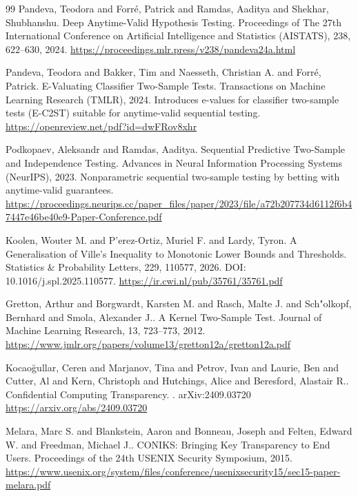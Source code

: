 \documentclass[11pt]{article}
\begin{document}
\begin{thebibliography}{99}
Pandeva, Teodora and Forr{\'e}, Patrick and Ramdas, Aaditya and Shekhar, Shubhanshu.
\newblock Deep Anytime-Valid Hypothesis Testing.
\newblock Proceedings of The 27th International Conference on Artificial Intelligence and Statistics (AISTATS), 238, 622--630, 2024.
\newblock \url{https://proceedings.mlr.press/v238/pandeva24a.html}

Pandeva, Teodora and Bakker, Tim and Naesseth, Christian A. and Forr{\'e}, Patrick.
\newblock E-Valuating Classifier Two-Sample Tests.
\newblock Transactions on Machine Learning Research (TMLR), 2024.
\newblock Introduces e-values for classifier two-sample tests (E-C2ST) suitable for anytime-valid sequential testing.
\newblock \url{https://openreview.net/pdf?id=dwFRov8xhr}

Podkopaev, Aleksandr and Ramdas, Aaditya.
\newblock Sequential Predictive Two-Sample and Independence Testing.
\newblock Advances in Neural Information Processing Systems (NeurIPS), 2023.
\newblock Nonparametric sequential two-sample testing by betting with anytime-valid guarantees.
\newblock \url{https://proceedings.neurips.cc/paper_files/paper/2023/file/a72b207734d6112f6b47447e46be40e9-Paper-Conference.pdf}

Koolen, Wouter M. and P{'e}rez-Ortiz, Muriel F. and Lardy, Tyron.
\newblock A Generalisation of Ville's Inequality to Monotonic Lower Bounds and Thresholds.
\newblock Statistics \& Probability Letters, 229, 110577, 2026.
\newblock DOI: 10.1016/j.spl.2025.110577.
\newblock \url{https://ir.cwi.nl/pub/35761/35761.pdf}

Gretton, Arthur and Borgwardt, Karsten M. and Rasch, Malte J. and Sch{"o}lkopf, Bernhard and Smola, Alexander J..
\newblock A Kernel Two-Sample Test.
\newblock Journal of Machine Learning Research, 13, 723--773, 2012.
\newblock \url{https://www.jmlr.org/papers/volume13/gretton12a/gretton12a.pdf}

Kocao\u{g}ullar, Ceren and Marjanov, Tina and Petrov, Ivan and Laurie, Ben and Cutter, Al and Kern, Christoph and Hutchings, Alice and Beresford, Alastair R..
\newblock Confidential Computing Transparency.
.
\newblock arXiv:2409.03720
\newblock \url{https://arxiv.org/abs/2409.03720}

Melara, Marc S. and Blankstein, Aaron and Bonneau, Joseph and Felten, Edward W. and Freedman, Michael J..
\newblock CONIKS: Bringing Key Transparency to End Users.
\newblock Proceedings of the 24th USENIX Security Symposium, 2015.
\newblock \url{https://www.usenix.org/system/files/conference/usenixsecurity15/sec15-paper-melara.pdf}


\end{thebibliography}
\end{document}
